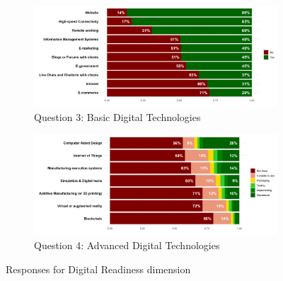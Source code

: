 \documentclass[12pt]{report}
\begin{document}
\begin{figure}
    \centering
    \begin{subfigure}[b]{0.8\textwidth}
        \centering
        \includegraphics[width=\linewidth]{../Output/q3.png}
        \caption{Question 3: Basic Digital Technologies}
    \end{subfigure}
    \vfill
    \begin{subfigure}[b]{0.8\textwidth}
        \centering
        \includegraphics[width=\linewidth]{../Output/q4.png}
        \caption{Question 4: Advanced Digital Technologies}
    \end{subfigure}
    \caption{Responses for Digital Readiness dimension}
\end{figure}
\end{document}
